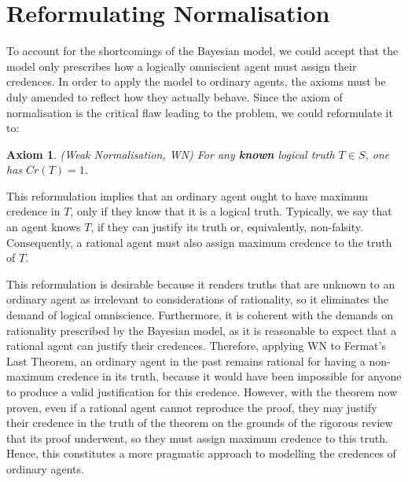 \documentclass[12pt]{article}
\newtheorem{axiom}{Axiom}
\begin{document}
\section{Reformulating Normalisation}
To account for the shortcomings of the Bayesian model, we could accept that the model only prescribes how a logically omniscient agent must assign their credences. In order to apply the model to ordinary agents, the axioms must be duly amended to reflect how they actually behave. Since the axiom of normalisation is the critical flaw leading to the problem, we could reformulate it to:
\begin{axiom}
    (Weak Normalisation, WN) For any \textbf{known} logical truth $T\in S$, one has $Cr(T)=1$.
\end{axiom}
This reformulation implies that an ordinary agent ought to have maximum credence in $T$, only if they know that it is a logical truth.\autocite{sep} Typically, we say that an agent knows $T$, if they can justify its truth or, equivalently, non-falsity. Consequently, a rational agent must also assign maximum credence to the truth of $T$.

This reformulation is desirable because it renders truths that are unknown to an ordinary agent as irrelevant to considerations of rationality, so it eliminates the demand of logical omniscience. Furthermore, it is coherent with the demands on rationality prescribed by the Bayesian model, as it is reasonable to expect that a rational agent can justify their credences. Therefore, applying WN to Fermat's Last Theorem, an ordinary agent in the past remains rational for having a non-maximum credence in its truth, because it would have been impossible for anyone to produce a valid justification for this credence. However, with the theorem now proven, even if a rational agent cannot reproduce the proof, they may justify their credence in the truth of the theorem on the grounds of the rigorous review that its proof underwent, so they must assign maximum credence to this truth. Hence, this constitutes a more pragmatic approach to modelling the credences of ordinary agents.
\end{document}
